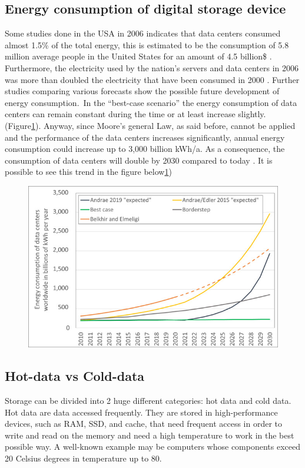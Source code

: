 \documentclass[10pt,twocolumn,twoside]{gsajnl}
\begin{document}
\subsection{Energy consumption of digital storage device}    Some studies done in the USA in 2006 indicates that data centers consumed almost 1.5\% of the total energy, this is estimated to be the consumption of 5.8 million average people in the United States for an amount of 4.5 billion\$ . Furthermore, the electricity used by the nation’s servers and data centers in 2006 was more than doubled the electricity that have been consumed in 2000 \cite{shehabi2016united}. Further studies comparing various forecasts show the possible future development of energy consumption.\
In the “best-case scenario” the energy consumption of data centers can remain constant during the time or at least increase slightly. (Figure\ref{fig:my_label2}). Anyway, since Moore's general Law, as said before, cannot be applied and the performance of the data centers increases significantly, annual energy consumption could increase up to 3,000 billion kWh/a. As a consequence, the consumption of data centers will double by 2030 compared to today \cite{hintemann2019energy}.
It is possible to see this trend in the figure below\ref{fig:my_label2})

\begin{figure}[ht]
    \includegraphics[width=\linewidth]{Figures/Energy-consumption-of-servers-and-data-centers-worldwide-forecasts-to-2030-A-comparison.jpg}
    \centering
    \caption{\cite{inproceedings}}
    \label{fig:my_label2}
\end{figure}

\subsection{Hot-data vs Cold-data}
Storage can be divided into 2 huge different categories: hot data and cold data.
Hot data are data accessed frequently. They are stored in high-performance devices, such as RAM, SSD, and cache, that need frequent access in order to write and read on the memory and need a high temperature to work in the best possible way. A well-known example may be computers whose components exceed 20 Celsius degrees in temperature up to 80.
\end{document}
